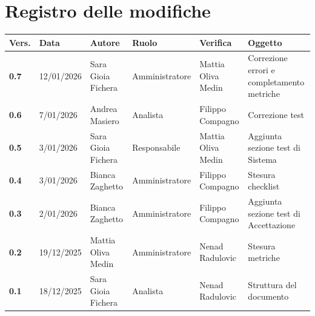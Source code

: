 \documentclass[a4paper,12pt]{article}
\begin{document}
    

    \section*{Registro delle modifiche} {
        \begin{table}[h!]
                \begin{tabularx}{\textwidth}{|l|l|l|l|L|L|}
                \hline
                \textbf{Vers.} & \textbf{Data} & \textbf{Autore} & \textbf{Ruolo} & \textbf{Verifica} & \textbf{Oggetto} \\
                \hline
                \textbf{0.7} & 12/01/2026 & Sara Gioia Fichera & Amministratore & Mattia Oliva Medin & Correzione errori e completamento metriche \\
                \hline
                \textbf{0.6} & 7/01/2026 & Andrea Masiero & Analista & Filippo Compagno & Correzione test \\
                \hline
                \textbf{0.5} & 3/01/2026 & Sara Gioia Fichera & Responsabile & Mattia Oliva Medin & Aggiunta sezione test di Sistema \\
                \hline
                \textbf{0.4} & 3/01/2026 & Bianca Zaghetto & Amministratore & Filippo Compagno & Stesura checklist \\
                \hline
                \textbf{0.3} & 2/01/2026 & Bianca Zaghetto & Amministratore & Filippo Compagno & Aggiunta sezione test di Accettazione \\
                \hline
                \textbf{0.2} & 19/12/2025 & Mattia Oliva Medin & Amministratore & Nenad Radulovic & Stesura metriche\\
                \hline
                \textbf{0.1} & 18/12/2025 & Sara Gioia Fichera & Analista & Nenad Radulovic & Struttura del documento \\
                \hline
            \end{tabularx}
        \end{table}
    }
    \newpage
    
    \tableofcontents
    \newpage

    \listoffigures
    \newpage

    \listoftables
    \newpage
    
\end{document}
